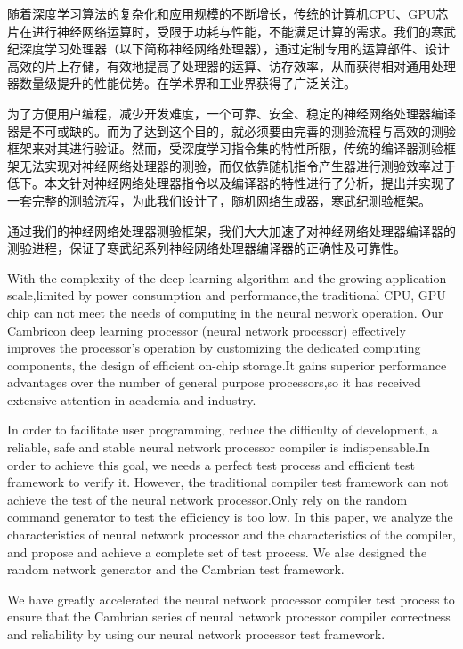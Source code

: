 ﻿\begin{cnabstract}
随着深度学习算法的复杂化和应用规模的不断增长，传统的计算机CPU、GPU芯片在进行神经网络运算时，受限于功耗与性能，不能满足计算的需求。我们的寒武纪深度学习处理器（以下简称神经网络处理器），通过定制专用的运算部件、设计高效的片上存储，有效地提高了处理器的运算、访存效率，从而获得相对通用处理器数量级提升的性能优势。在学术界和工业界获得了广泛关注。

为了方便用户编程，减少开发难度，一个可靠、安全、稳定的神经网络处理器编译器是不可或缺的。而为了达到这个目的，就必须要由完善的测验流程与高效的测验框架来对其进行验证。然而，受深度学习指令集的特性所限，传统的编译器测验框架无法实现对神经网络处理器的测验，而仅依靠随机指令产生器进行测验效率过于低下。本文针对神经网络处理器指令以及编译器的特性进行了分析，提出并实现了一套完整的测验流程，为此我们设计了，随机网络生成器，寒武纪测验框架。

通过我们的神经网络处理器测验框架，我们大大加速了对神经网络处理器编译器的测验进程，保证了寒武纪系列神经网络处理器编译器的正确性及可靠性。

\end{cnabstract}

\begin{enabstract}
With the complexity of the deep learning algorithm and the growing application scale,limited by power consumption and performance,the traditional CPU, GPU chip can not meet the needs of computing in the neural network operation. Our Cambricon deep learning processor (neural network processor) effectively improves the processor's operation by customizing the dedicated computing components, the design of efficient on-chip storage.It gains superior performance advantages over the number of general purpose processors,so it has received extensive attention in academia and industry.

In order to facilitate user programming, reduce the difficulty of development, a reliable, safe and stable neural network processor compiler is indispensable.In order to achieve this goal, we needs a perfect test process and efficient test framework to verify it. However, the traditional compiler test framework can not achieve the test of the neural network processor.Only rely on the random command generator to test the efficiency is too low. In this paper, we analyze the characteristics of neural network processor and the characteristics of the compiler, and propose and achieve a complete set of test process. We alse designed the random network generator and the Cambrian test framework.

We have greatly accelerated the neural network processor compiler test process to ensure that the Cambrian series of neural network processor compiler correctness and reliability by using our neural network processor test framework.

\end{enabstract}
